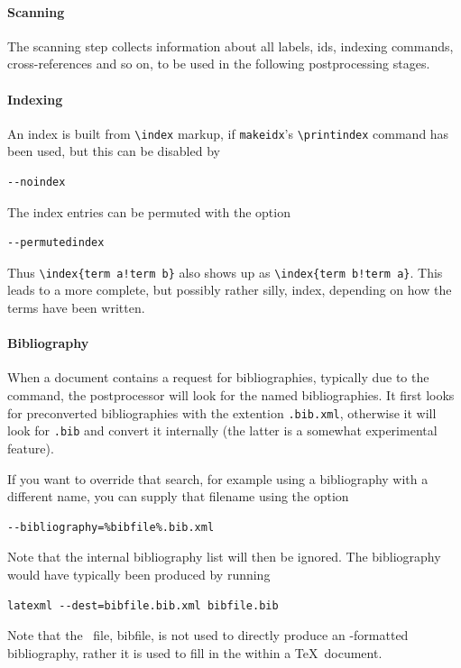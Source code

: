 \documentclass{book}
\newcommand{\shellcode}{\lstinline[style=shell]}
\begin{document}
\paragraph{Scanning}\label{usage.post.scanning}
The scanning step collects information about all labels, ids,
indexing commands, cross-references and so on, to be used
in the following postprocessing stages.

\paragraph{Indexing}\label{usage.post.indexing}
An index is built from \verb|\index| markup, if
\shellcode{makeidx}'s \verb|\printindex| command has been used,
but this can be disabled by
\begin{lstlisting}[style=shell]
--noindex
\end{lstlisting}
The index entries can be permuted with the option
\begin{lstlisting}[style=shell]
--permutedindex
\end{lstlisting}
Thus \verb|\index{term a!term b}| also shows up as \verb|\index{term b!term a}|.
This leads to a more complete, but possibly rather silly, index,
depending on how the terms have been written.

\paragraph{Bibliography}\label{usage.post.bibtex}
When a document contains a request for bibliographies,
typically due to the \verb|| command,
the postprocessor will look for the named bibliographies.
It first looks for preconverted bibliographies with the
extention \verb|.bib.xml|, otherwise it will look
for \verb|.bib| and convert it internally (the latter
is a somewhat experimental feature).

If you want to override that search, for example using a bibliography
with a different name,  you can supply that filename using the option
\begin{lstlisting}[style=shell]
--bibliography=%bibfile%.bib.xml
\end{lstlisting}
Note that the internal bibliography list will then be ignored.
The bibliography would have typically been produced by running
\begin{lstlisting}[style=shell]
latexml --dest=bibfile.bib.xml bibfile.bib
\end{lstlisting}
Note that the \XML\ file, bibfile, is not used to directly produce
an \HTML-formatted bibliography, rather it is used to fill in
the \verb|| within a \TeX\ document.
\end{document}
